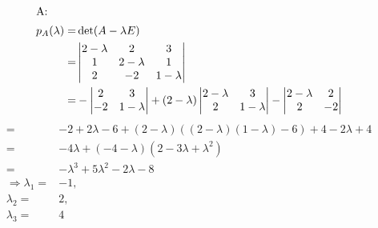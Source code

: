 \documentclass{HM}
\begin{document}
\begin{enumerate}
	\begin{align*}
		\intertext{A:}
		p_A(\lambda)=&\det(A -\lambda E)\\
		=&\begin{vmatrix}
			2-\lambda&2&3\\
			1&2-\lambda&1\\
			2&-2&1-\lambda
		\end{vmatrix}\\
		=&-\begin{vmatrix}
			2&3\\
			-2&1-\lambda
		\end{vmatrix}+(2-\lambda)\begin{vmatrix}
			2-\lambda&3\\
			2&1-\lambda
		\end{vmatrix}-\begin{vmatrix}
			2-\lambda&2\\
			2&-2
		\end{vmatrix}\\
	\end{align*}
	\begin{align*}
		=&-2+2\lambda-6+(2-\lambda)((2-\lambda)(1-\lambda)-6)+4-2\lambda+4\\
		=&-4\lambda+(-4-\lambda)(2-3\lambda+\lambda^2)\\
		=&-\lambda^3+5\lambda^2-2\lambda-8\\
		\Rightarrow\lambda_1=&-1,\\
		\lambda_2=& 2,\\
		\lambda_3=& 4\\
	\end{align*}
	

\end{enumerate}
\end{document}
